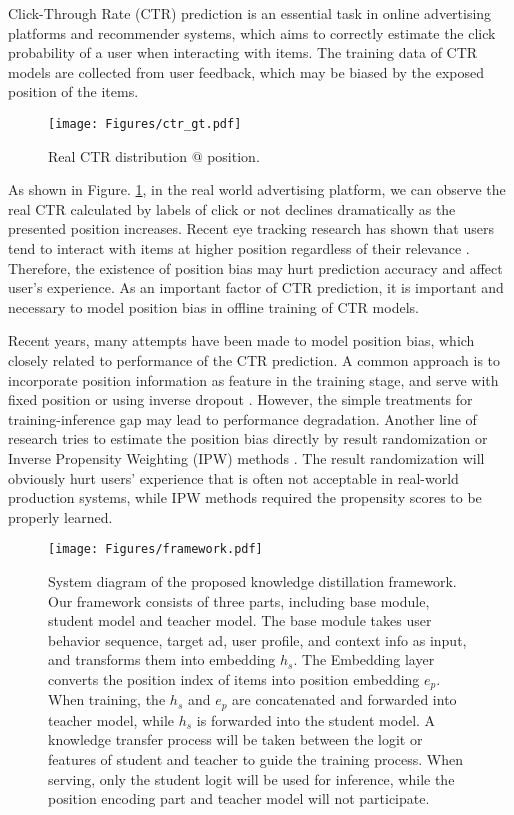 \documentclass[sigconf,natbib=true,anonymous=false]{acmart}
\begin{document}
Click-Through Rate (CTR) prediction is an essential task in online advertising platforms and recommender systems, which aims to correctly estimate the click probability of a user when interacting with items.
The training data of CTR models are collected from user feedback, which may be biased by the exposed position of the items.
\begin{figure}[!t]
  \texttt{[image: Figures/ctr\_gt.pdf]}
  \caption{Real CTR distribution @ position.}
  \label{fig:ctr_gt}
\end{figure}
As shown in Figure. \ref{fig:ctr_gt}, in the real world advertising platform, we can observe the real CTR calculated by labels of click or not declines dramatically as the presented position increases.
Recent eye tracking research has shown that users tend to interact with items at higher position regardless of their relevance \cite{joachims2007evaluating,joachims2017accurately}. 
Therefore, the existence of position bias may hurt prediction accuracy and affect user's experience.
As an important factor of CTR prediction, it is important and necessary to model position bias in offline training of CTR models.

Recent years, many attempts have been made to model position bias, which closely related to performance of the CTR prediction.
A common approach is to incorporate position information as feature in the training stage, and serve with fixed position or using inverse dropout \cite{zhao2019recommending}.
However, the simple treatments for training-inference gap may lead to performance degradation. 
Another line of research tries to estimate the position bias directly by result randomization\cite{hofmann2013reusing,swaminathan2015batch,wang2016learning} or Inverse Propensity Weighting (IPW) methods \cite{ai2018unbiased,wang2018position,chen2021adapting}.
The result randomization will obviously hurt users' experience that is often not acceptable in real-world production systems, while IPW methods required the propensity scores to be properly learned.

\begin{figure*}[!t]
  \texttt{[image: Figures/framework.pdf]}
  \caption{System diagram of the proposed knowledge distillation framework. Our framework consists of three parts, including base module, student model and teacher model. The base module takes user behavior sequence, target ad, user profile, and context info as input, and transforms them into embedding $h_s$. The Embedding layer converts the position index of items into position embedding $e_p$. When training, the $h_s$ and $e_p$ are concatenated and forwarded into teacher model, while $h_s$ is forwarded into the student model. A knowledge transfer process will be taken between the logit or features of student and teacher to guide the training process. When serving, only the student logit will be used for inference, while the position encoding part and teacher model will not participate.}
  \label{fig:system}
\end{figure*}
\end{document}
